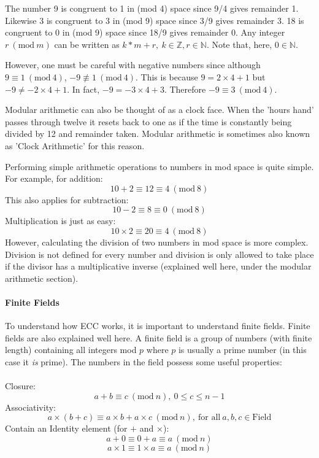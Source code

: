 \documentclass{article}
\begin{document}
The number 9 is congruent to 1 in (mod 4) space since 9/4 gives remainder 1. Likewise 3 is congruent to 3 in (mod 9) space since 3/9 gives remainder 3. 18 is congruent to 0 in (mod 9) space since 18/9 gives remainder 0. Any integer $r\ (\textrm{mod}\ m)$ can be written as $k*m+r,\ k \in \mathbb{Z}, r \in \mathbb{N}$. Note that, here, $0 \in \mathbb{N}$.

However, one must be careful with negative numbers since although $9 \equiv 1\ (\textrm{mod}\ 4)$, $-9 \not\equiv 1\ (\textrm{mod}\ 4)$. This is because $9=2\times4+1$ but $-9\not=-2\times4+1$. In fact, $-9=-3\times4+3$. Therefore $-9 \equiv 3\ (\textrm{mod}\ 4)$.

Modular arithmetic can also be thought of as a clock face. When the 'hours hand' passes through twelve it resets back to one as if the time is constantly being divided by 12 and remainder taken. Modular arithmetic is sometimes also known as 'Clock Arithmetic' for this reason.

Performing simple arithmetic operations to numbers in mod space is quite simple. For example, for addition: \[10+2 \equiv 12 \equiv 4\ (\textrm{mod}\ 8)\]This also applies for subtraction: \[10-2 \equiv 8 \equiv 0\ (\textrm{mod}\ 8)\] Multiplication is just as easy: \[10\times 2 \equiv 20 \equiv 4\ (\textrm{mod}\ 8)\]
However, calculating the division of two numbers in mod space is more complex. Division is not defined for every number and division is only allowed to take place if the divisor has a multiplicative inverse (explained well here\cite{ic_encryption_course}, under the modular arithmetic section).

\paragraph{Finite Fields}
To understand how ECC works, it is important to understand finite fields. Finite fields are also explained well here\cite{ic_encryption_course}. A finite field is a group of numbers (with finite length) containing all integers mod $p$ where $p$ is usually a prime number (in this case it \emph{is} prime). The numbers in the field possess some useful properties:\\
\\Closure:
\[a+b \equiv c\ (\textrm{mod}\ n),\ 0 \leq c \leq n-1\]
Associativity:
\[a\times (b + c) \equiv a\times b + a\times c\ (\textrm{mod}\ n),\ \textrm{for all}\ a,b,c \in \textrm{Field}\]
Contain an Identity element (for $+$ and $\times$):
\[a+0 \equiv 0+a \equiv a\ (\textrm{mod}\ n)\]
\[a\times 1 \equiv 1\times a \equiv a\ (\textrm{mod}\ n)\]
\end{document}
